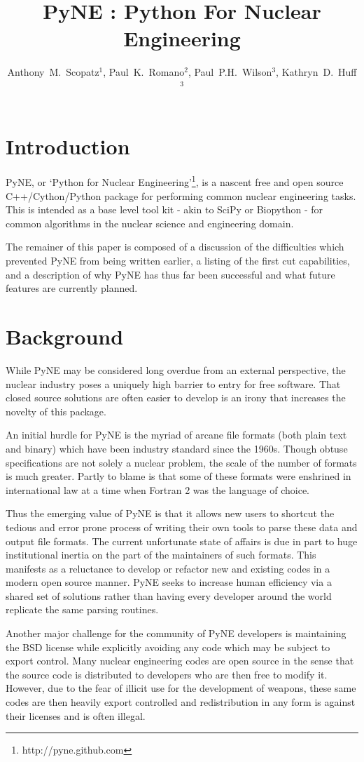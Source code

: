 \documentclass{anstrans}
\title{PyNE : Python For Nuclear Engineering}
\author{Anthony~M.~Scopatz$^1$, Paul~K.~Romano$^2$, Paul~P.H.~Wilson$^3$, Kathryn~D.~Huff$^3$}
\institute{$^1$ University of Chicago, $^2$ Massachusetts Institute of Technology, $^3$ University of Wisconsin }
\date{}
\begin{document}
\section{Introduction}

PyNE, or `Python for Nuclear Engineering'\footnote{http://pyne.github.com}, is a
nascent free and open source C++/Cython/Python package for performing common
nuclear engineering tasks.  This is intended as a base level tool kit - akin to
SciPy or Biopython - for common algorithms in the nuclear science and
engineering domain.

The remainer of this paper is composed of a discussion of the difficulties 
which prevented PyNE from being written earlier, a listing of the first cut 
capabilities, and a description of why PyNE has thus far been 
successful and what future features are currently planned.


\section{Background}

While PyNE may be considered long overdue from an external perspective, the 
nuclear industry poses a uniquely high barrier to entry for free software.  
That closed source solutions are often easier to develop is an irony that 
increases the novelty of this package.

An initial hurdle for PyNE is the myriad of arcane file formats (both plain text
and binary) which have been industry standard since the 1960s.  Though obtuse
specifications are not solely a nuclear problem, the scale of the number of
formats is much greater.  Partly to blame is that some of these formats were
enshrined in international law at a time when Fortran 2 was the language of
choice.

Thus the emerging value of PyNE is that it allows new users to shortcut the
tedious and error prone process of writing their own tools to parse these data
and output file formats.  The current unfortunate state of affairs is due in
part to huge institutional inertia on the part of the maintainers of such
formats.  This manifests as a reluctance to develop or refactor new and existing
codes in a modern open source manner.  PyNE seeks to increase human efficiency
via a shared set of solutions rather than having every developer around the
world replicate the same parsing routines.

Another major challenge for the community of PyNE developers is maintaining the
BSD license while explicitly avoiding any code which may be subject to export
control.  Many nuclear engineering codes are open source in the sense that the
source code is distributed to developers who are then free to modify it.
However, due to the fear of illicit use for the development of weapons, these
same codes are then heavily export controlled and redistribution in any form is
against their licenses and is often illegal.
\end{document}
